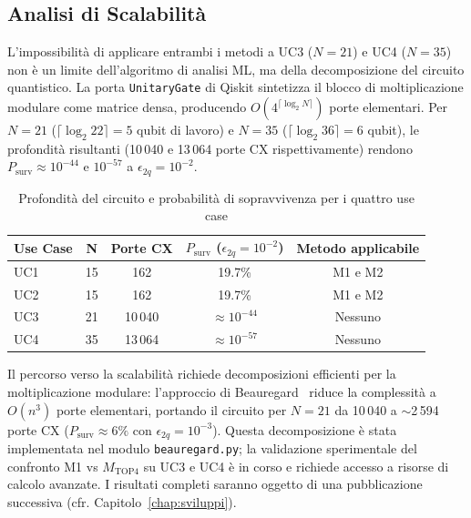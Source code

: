 \begin{onehalfspace}
\section{Analisi di Scalabilità}
\label{sec:scalabilita}

L'impossibilità di applicare entrambi i metodi a UC3 ($N=21$) e UC4 ($N=35$) non è un limite dell'algoritmo di analisi \ac{ML}, ma della decomposizione del circuito quantistico. La porta \texttt{UnitaryGate} di Qiskit sintetizza il blocco di moltiplicazione modulare come matrice densa, producendo $O(4^{\lceil\log_2 N\rceil})$ porte elementari. Per $N=21$ ($\lceil\log_2 22\rceil = 5$ qubit di lavoro) e $N=35$ ($\lceil\log_2 36\rceil = 6$ qubit), le profondità risultanti (10\,040 e 13\,064 porte CX rispettivamente) rendono $P_{\text{surv}} \approx 10^{-44}$ e $10^{-57}$ a $\epsilon_{2q} = 10^{-2}$.

\begin{table}[H]
\centering
\caption{Profondità del circuito e probabilità di sopravvivenza per i quattro use case}
\label{tab:scalabilita}
\begin{tabular}{lcccc}
\hline
\textbf{Use Case} & \textbf{N} & \textbf{Porte CX} & \textbf{$P_{\text{surv}}$ ($\epsilon_{2q}=10^{-2}$)} & \textbf{Metodo applicabile} \\
\hline
UC1 & 15 & 162     & 19.7\%                & M1 e M2 \\
UC2 & 15 & 162     & 19.7\%                & M1 e M2 \\
UC3 & 21 & 10\,040 & $\approx 10^{-44}$    & Nessuno \\
UC4 & 35 & 13\,064 & $\approx 10^{-57}$    & Nessuno \\
\hline
\end{tabular}
\end{table}

Il percorso verso la scalabilità richiede decomposizioni efficienti per la moltiplicazione modulare: l'approccio di Beauregard~\cite{beauregard2002} riduce la complessità a $O(n^3)$ porte elementari, portando il circuito per $N=21$ da 10\,040 a $\sim$2\,594 porte CX ($P_{\text{surv}}\approx 6\%$ con $\epsilon_{2q}=10^{-3}$). Questa decomposizione è stata implementata nel modulo \texttt{beauregard.py}; la validazione sperimentale del confronto M1 vs $M_{\text{TOP4}}$ su UC3 e UC4 è in corso e richiede accesso a risorse di calcolo avanzate. I risultati completi saranno oggetto di una pubblicazione successiva (cfr. Capitolo~\ref{chap:sviluppi}).


\end{onehalfspace}

